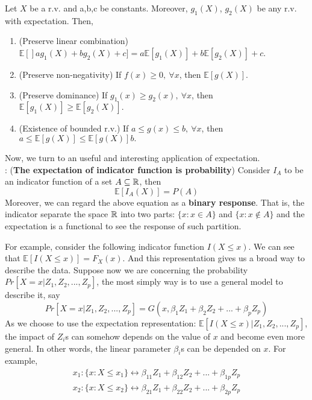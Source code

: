 \documentclass[11pt]{article}
\begin{document}
\begin{property}
	Let $X$ be a r.v. and a,b,c be constants. Moreover, $g_1(X)$, $g_2(X)$ be any r.v. with expectation. Then,
	\begin{enumerate}
		\item (Preserve linear combination) $\mathbb{E}[]ag_1(X)+bg_2(X)+c]=a\mathbb{E}[g_1(X)] + b\mathbb{E}[g_2(X)] + c$.
		\item (Preserve non-negativity) If $f(x)\geq0,\ \forall x$, then $\mathbb{E}[g(X)]$.
		\item (Preserve dominance) If $g_1(x)\geq g_2(x),\ \forall x$, then $\mathbb{E}[g_1(X)]\geq\mathbb{E}[g_2(X)].$
		\item (Existence of bounded r.v.) If $a\leq g(x) \leq b,\ \forall x$, then $a\leq \mathbb{E}[g(X)]\leq\mathbb{E}[g(X)] b.$
	\end{enumerate}
\end{property}

Now, we turn to an useful and interesting application of expectation.\\

: ({\bf The expectation of indicator function is probability})
Consider $I_A$ to be an indicator function of a set $A\subseteq{\mathbb R}$, then
$$\mathbb{E}[I_A(X)] = P(A)$$
Moreover, we can regard the above equation as a {\bf binary response}. That is, the indicator separate the space ${\mathbb R}$ into two parts: $\{x:x\in A\}$ and $\{x:x\notin A \}$ and the expectation is a functional to see the response of such partition.

For example, consider the following indicator function $I(X\leq x)$. We can see that $\mathbb{E}[I(X\leq x)] = F_X(x)$. And this representation gives us a broad way to describe the data. Suppose now we are concerning the probability $Pr[X=x|Z_1,Z_2,...,Z_p]$, the most simply way is to use a general model to describe it, say
$$Pr[X=x|Z_1,Z_2,...,Z_p] = G(x,\beta_1Z_1+\beta_2Z_2+...+\beta_pZ_p)$$
As we choose to use the expectation representation: $\mathbb{E}[I(X\leq x)|Z_1,Z_2,...,Z_p]$, the impact of $Z_i$s can somehow depends on the value of $x$ and become even more general. In other words, the linear parameter $\beta_i$s can be depended on $x$. For example,
\begin{align*}
x_1: \{x:X\leq x_1 \}\leftrightarrow \beta_{11}Z_1+\beta_{12}Z_2+...+\beta_{1p}Z_p\\
x_2: \{x:X\leq x_2 \}\leftrightarrow \beta_{21}Z_1+\beta_{22}Z_2+...+\beta_{2p}Z_p
\end{align*}
\end{document}
